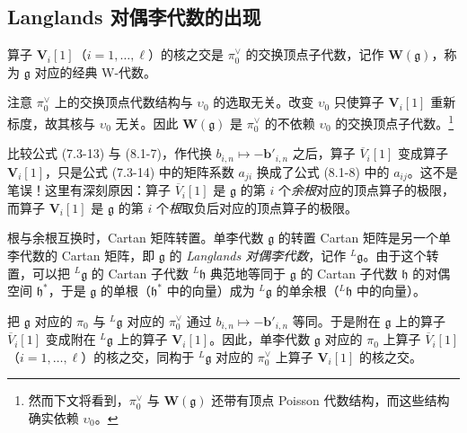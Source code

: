 
\subsection{Langlands 对偶李代数的出现}

算子 $\mathbf V_i[1]$（$i=1,\dots,\ell$）的核之交是 $\pi^\vee_0$ 的交换顶点子代数，记作 $\mathbf W(\mathfrak g)$，称为 $\mathfrak g$ 对应的经典 W-代数。

注意 $\pi^\vee_0$ 上的交换顶点代数结构与 $\upsilon_0$ 的选取无关。改变 $\upsilon_0$ 只使算子 $\mathbf V_i[1]$ 重新标度，故其核与 $\upsilon_0$ 无关。因此 $\mathbf W(\mathfrak g)$ 是 $\pi^\vee_0$ 的不依赖 $\upsilon_0$ 的交换顶点子代数。\footnote{然而下文将看到，$\pi^\vee_0$ 与 $\mathbf W(\mathfrak g)$ 还带有顶点 Poisson 代数结构，而这些结构确实依赖 $\upsilon_0$。}

比较公式 (7.3-13) 与 (8.1-7)，作代换 $b_{i,n}\mapsto-\mathbf b'_{i,n}$ 之后，算子 $\overline V_i[1]$ 变成算子 $\mathbf V_i[1]$，只是公式 (7.3-14) 中的矩阵系数 $a_{ji}$ 换成了公式 (8.1-8) 中的 $a_{ij}$。这不是笔误！这里有深刻原因：算子 $\overline V_i[1]$ 是 $\mathfrak g$ 的第 $i$ 个\emph{余根}对应的顶点算子的极限，而算子 $\mathbf V_i[1]$ 是 $\mathfrak g$ 的第 $i$ 个\emph{根}取负后对应的顶点算子的极限。

根与余根互换时，Cartan 矩阵转置。单李代数 $\mathfrak g$ 的转置 Cartan 矩阵是另一个单李代数的 Cartan 矩阵，即 $\mathfrak g$ 的 \emph{Langlands 对偶李代数}，记作 ${}^L\mathfrak g$。由于这个转置，可以把 ${}^L\mathfrak g$ 的 Cartan 子代数 ${}^L\mathfrak h$ 典范地等同于 $\mathfrak g$ 的 Cartan 子代数 $\mathfrak h$ 的对偶空间 $\mathfrak h^*$，于是 $\mathfrak g$ 的单根（$\mathfrak h^*$ 中的向量）成为 ${}^L\mathfrak g$ 的单余根（${}^L\mathfrak h$ 中的向量）。

把 $\mathfrak g$ 对应的 $\pi_0$ 与 ${}^L\mathfrak g$ 对应的 $\pi^\vee_0$ 通过 $b_{i,n}\mapsto-\mathbf b'_{i,n}$ 等同。于是附在 $\mathfrak g$ 上的算子 $\overline V_i[1]$ 变成附在 ${}^L\mathfrak g$ 上的算子 $\mathbf V_i[1]$。因此，单李代数 $\mathfrak g$ 对应的 $\pi_0$ 上算子 $\overline V_i[1]$（$i=1,\dots,\ell$）的核之交，同构于 ${}^L\mathfrak g$ 对应的 $\pi^\vee_0$ 上算子 $\mathbf V_i[1]$ 的核之交。

